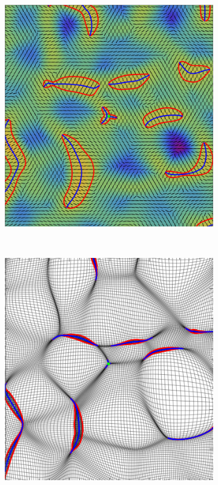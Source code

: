 \documentclass[a4paper, 11pt]{article}
\begin{document}
\begin{figure}
\begin{subfigure}[b]{0.28\textwidth}
\end{subfigure}\\ \vspace{0.2\baselineskip}
\begin{subfigure}[b]{0.28\textwidth}
\includegraphics[width=\textwidth]{Elliptic_L}
\end{subfigure}~
\begin{subfigure}[b]{0.28\textwidth}
\includegraphics[width=\textwidth]{Elliptic_Z}

\end{subfigure}
\end{figure}
\end{document}
